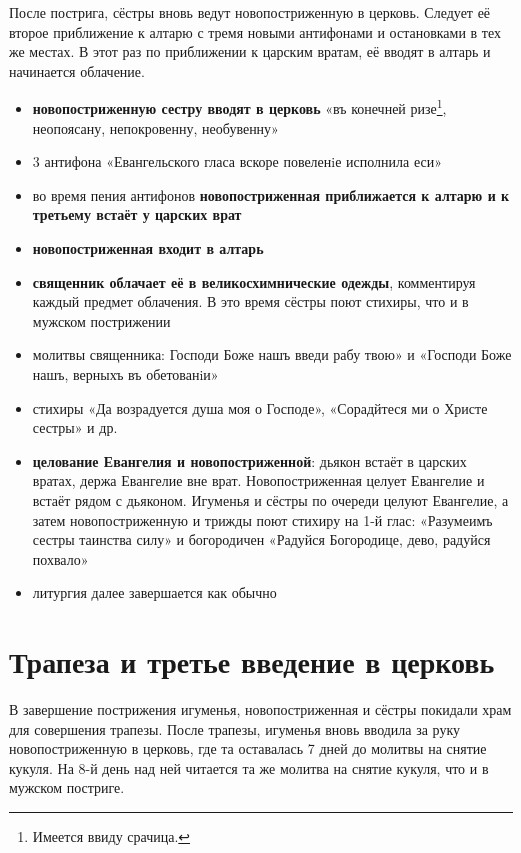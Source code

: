 После пострига, сёстры вновь ведут новопостриженную в церковь.
Следует её второе приближение к алтарю с тремя новыми антифонами и остановками в тех же местах.
В этот раз по приближении к царским вратам, её вводят в алтарь и начинается облачение.

\begin{itemize}
\tightlist
\item
  \textbf{новопостриженную сестру вводят в церковь} «въ конечней ризе\footnote{Имеется ввиду срачица.}, неопоясану, непокровенну, необувенну»
\item
  3 антифона «Евангельского гласа вскоре повеленiе исполнила еси»
\item
  во время пения антифонов \textbf{новопостриженная приближается к алтарю и к третьему встаёт у царских врат}
\item
  \textbf{новопостриженная входит в алтарь}
\item
  \textbf{священник облачает её в великосхимнические одежды}, комментируя каждый предмет облачения. В это время сёстры поют стихиры, что и в мужском пострижении
\item
  молитвы священника: Господи Боже нашъ введи рабу твою» и «Господи Боже нашъ, верныхъ въ обетованiи»
\item
  стихиры «Да возрадуется душа моя о Господе», «Сорадйтеся ми о Христе сестры» и др.
\item
  \textbf{целование Евангелия и новопостриженной}: дьякон встаёт в царских вратах, держа Евангелие вне врат. Новопостриженная целует Евангелие и встаёт рядом с дьяконом. Игуменья и сёстры по очереди целуют Евангелие, а затем новопостриженную и трижды поют стихиру на 1-й глас: «Разумеимъ сестры таинства силу» и богородичен «Радуйся Богородице, дево, радуйся похвало»
\item
  литургия далее завершается как обычно
\end{itemize}

\section*{Трапеза и третье введение в церковь}\label{ux442ux440ux430ux43fux435ux437ux430-ux438-ux442ux440ux435ux442ux44cux435-ux432ux432ux435ux434ux435ux43dux438ux435-ux432-ux446ux435ux440ux43aux43eux432ux44c}

В завершение пострижения игуменья, новопостриженная и сёстры покидали храм для совершения трапезы.
После трапезы, игуменья вновь вводила за руку новопостриженную в церковь, где та оставалась 7 дней до молитвы на снятие кукуля.
На 8-й день над ней читается та же молитва на снятие кукуля, что и в мужском постриге.

